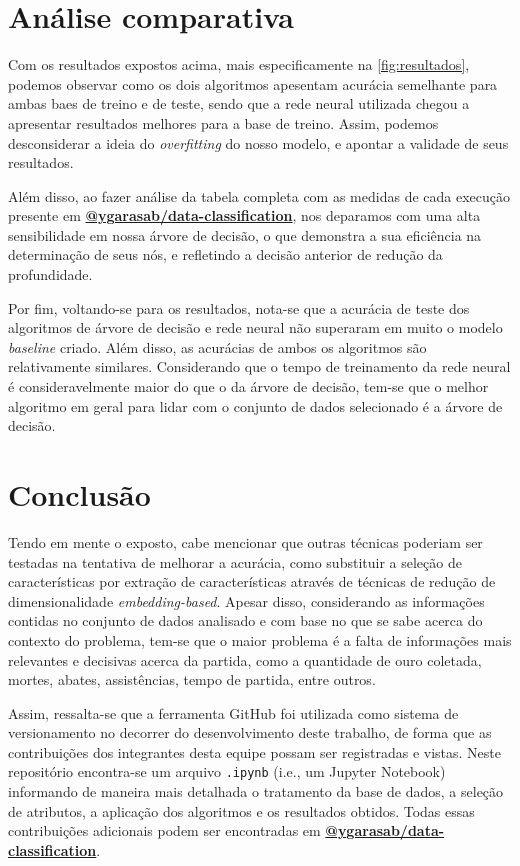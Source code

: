 \documentclass[12pt]{article}
\begin{document}
\section{Análise comparativa}\label{sec:analise}

Com os resultados expostos acima, mais especificamente na \autoref{fig:resultados}, podemos observar como os dois algoritmos apesentam acurácia semelhante para ambas baes de treino e de teste, sendo que a rede neural utilizada chegou a apresentar resultados melhores para a base de treino. Assim, podemos desconsiderar a ideia do \textit{overfitting} do nosso modelo, e apontar a validade de seus resultados.

Além disso, ao fazer análise da tabela completa com as medidas de cada execução presente em \textbf{\href{https://github.com/ygarasab/data-classification}{@ygarasab/data-classification}}, nos deparamos com uma alta sensibilidade em nossa árvore de decisão, o que demonstra a sua eficiência na determinação de seus nós, e refletindo a decisão anterior de redução da profundidade.

Por fim, voltando-se para os resultados, nota-se que a acurácia de teste dos algoritmos de árvore de decisão e rede neural não superaram em muito o modelo \textit{baseline} criado. Além disso, as acurácias de ambos os algoritmos são relativamente similares.  Considerando que o tempo de treinamento da rede neural é consideravelmente maior do que o da árvore de decisão, tem-se que o melhor algoritmo em geral para lidar com o conjunto de dados selecionado é a árvore de decisão. 

\section{Conclusão}\label{sec:conclusao}


Tendo em mente o exposto, cabe mencionar que outras técnicas poderiam ser testadas na tentativa de melhorar a acurácia, como substituir a seleção de características por extração de características através de técnicas de redução de dimensionalidade \textit{embedding-based}. Apesar disso, considerando as informações contidas no conjunto de dados analisado e com base no que se sabe acerca do contexto do problema, tem-se que o maior problema é a falta de informações mais relevantes e decisivas acerca da partida, como a quantidade de ouro coletada, mortes, abates, assistências, tempo de partida, entre outros. 

Assim, ressalta-se que a ferramenta GitHub foi utilizada como sistema de versionamento no decorrer do desenvolvimento deste trabalho, de forma que as contribuições dos integrantes desta equipe possam ser registradas e vistas. Neste repositório encontra-se um arquivo \texttt{.ipynb} (i.e., um Jupyter Notebook) informando de maneira mais detalhada o tratamento da base de dados, a seleção de atributos, a aplicação dos algoritmos e os resultados obtidos. Todas essas contribuições adicionais podem ser encontradas em \textbf{\href{https://github.com/ygarasab/data-classification}{@ygarasab/data-classification}}.




\end{document}
